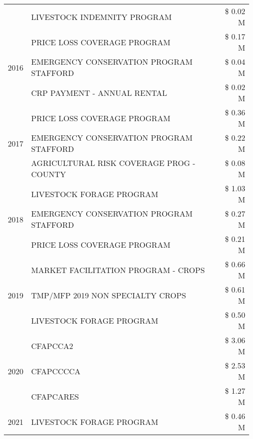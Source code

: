 \begin{tabular}{llr}
 & LIVESTOCK INDEMNITY PROGRAM & \$ 0.02 M \\
\cline{1-3}
\multirow[t]{3}{*}{2016} & PRICE LOSS COVERAGE PROGRAM & \$ 0.17 M \\
 & EMERGENCY CONSERVATION PROGRAM STAFFORD & \$ 0.04 M \\
 & CRP PAYMENT - ANNUAL RENTAL & \$ 0.02 M \\
\cline{1-3}
\multirow[t]{3}{*}{2017} & PRICE LOSS COVERAGE PROGRAM & \$ 0.36 M \\
 & EMERGENCY CONSERVATION PROGRAM STAFFORD & \$ 0.22 M \\
 & AGRICULTURAL RISK COVERAGE PROG - COUNTY & \$ 0.08 M \\
\cline{1-3}
\multirow[t]{3}{*}{2018} & LIVESTOCK FORAGE PROGRAM & \$ 1.03 M \\
 & EMERGENCY CONSERVATION PROGRAM STAFFORD & \$ 0.27 M \\
 & PRICE LOSS COVERAGE PROGRAM & \$ 0.21 M \\
\cline{1-3}
\multirow[t]{3}{*}{2019} & MARKET FACILITATION PROGRAM - CROPS & \$ 0.66 M \\
 & TMP/MFP 2019 NON SPECIALTY CROPS & \$ 0.61 M \\
 & LIVESTOCK FORAGE PROGRAM & \$ 0.50 M \\
\cline{1-3}
\multirow[t]{3}{*}{2020} & CFAPCCA2 & \$ 3.06 M \\
 & CFAPCCCCA & \$ 2.53 M \\
 & CFAPCARES & \$ 1.27 M \\
\cline{1-3}
2021 & LIVESTOCK FORAGE PROGRAM & \$ 0.46 M \\
\cline{1-3}
\bottomrule
\end{tabular}
